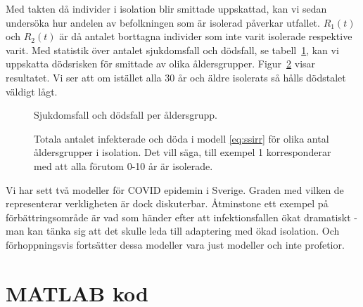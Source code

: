 \documentclass{article}
\newcommand\covid{COVID\nobreakdash-19}
\begin{document}
Med takten då individer i isolation blir smittade uppskattad,
kan vi sedan undersöka hur andelen av befolkningen som är isolerad påverkar utfallet.
$R_1(t)$ och $R_2(t)$ är då antalet borttagna individer som
inte varit isolerade respektive varit.
Med statistik över antalet sjukdomsfall och dödsfall,
se tabell~\ref{fig:casesPerAge},
kan vi uppskatta dödsrisken för smittade av olika åldersgrupper.
Figur~\ref{fig:isolation_values} visar resultatet.
Vi ser att om istället alla 30 år och äldre isolerats
så hålls dödstalet väldigt lågt.

\begin{figure}
	\centering
	\caption{Sjukdomsfall och dödsfall per åldersgrupp. \autocite{folkhalso} \label{fig:casesPerAge}}
\end{figure}

\begin{figure}
	\centering
	\caption{Totala antalet infekterade och döda i modell \eqref{eq:ssirr} för olika
	antal åldersgrupper i isolation.
	Det vill säga, till exempel 1 korresponderar med att alla förutom 0-10 år är isolerade.
	\label{fig:isolation_values}}
\end{figure}

\vspace{2em}

Vi har sett två modeller för \covid{} epidemin i Sverige.
Graden med vilken de representerar verkligheten är dock diskuterbar.
Åtminstone ett exempel på förbättringsområde är vad som händer
efter att infektionsfallen ökat dramatiskt -
man kan tänka sig att det skulle leda till adaptering med ökad isolation.
Och förhoppningsvis fortsätter dessa modeller vara just modeller
och inte profetior.

\printbibliography

\appendix

\section{MATLAB kod}

\end{document}
